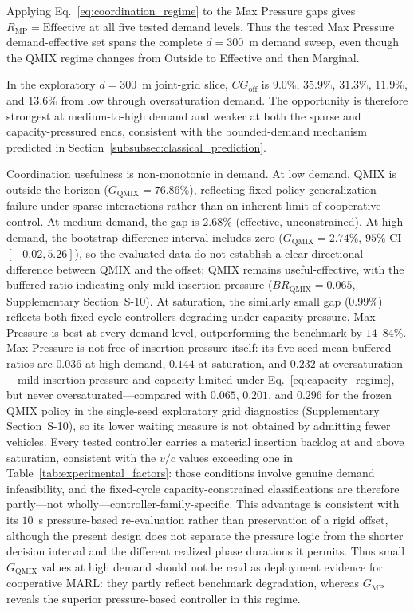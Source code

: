 \documentclass[review,12pt]{elsarticle}
\begin{document}
Applying Eq.~\eqref{eq:coordination_regime} to the Max Pressure gaps gives $R_{\mathrm{MP}}=\mathrm{Effective}$ at all five tested demand levels. Thus the tested Max Pressure demand-effective set spans the complete $d=300$~m demand sweep, even though the QMIX regime changes from Outside to Effective and then Marginal.

In the exploratory $d=300$~m joint-grid slice, $CG_{\mathrm{off}}$ is $9.0\%$, $35.9\%$, $31.3\%$, $11.9\%$, and $13.6\%$ from low through oversaturation demand. The opportunity is therefore strongest at medium-to-high demand and weaker at both the sparse and capacity-pressured ends, consistent with the bounded-demand mechanism predicted in Section~\ref{subsubsec:classical_prediction}.

Coordination usefulness is non-monotonic in demand. At low demand, QMIX is outside the horizon ($G_{\mathrm{QMIX}}=76.86\%$), reflecting fixed-policy generalization failure under sparse interactions rather than an inherent limit of cooperative control. At medium demand, the gap is $2.68\%$ (effective, unconstrained). At high demand, the bootstrap difference interval includes zero ($G_{\mathrm{QMIX}}=2.74\%$, $95\%$ CI $[-0.02, 5.26]$), so the evaluated data do not establish a clear directional difference between QMIX and the offset; QMIX remains useful-effective, with the buffered ratio indicating only mild insertion pressure ($BR_{\mathrm{QMIX}}=0.065$, Supplementary Section~S-10). At saturation, the similarly small gap ($0.99\%$) reflects both fixed-cycle controllers degrading under capacity pressure. Max Pressure is best at every demand level, outperforming the benchmark by $14$--$84\%$. Max Pressure is not free of insertion pressure itself: its five-seed mean buffered ratios are $0.036$ at high demand, $0.144$ at saturation, and $0.232$ at oversaturation---mild insertion pressure and capacity-limited under Eq.~\eqref{eq:capacity_regime}, but never oversaturated---compared with $0.065$, $0.201$, and $0.296$ for the frozen QMIX policy in the single-seed exploratory grid diagnostics (Supplementary Section~S-10), so its lower waiting measure is not obtained by admitting fewer vehicles. Every tested controller carries a material insertion backlog at and above saturation, consistent with the $v/c$ values exceeding one in Table~\ref{tab:experimental_factors}: those conditions involve genuine demand infeasibility, and the fixed-cycle capacity-constrained classifications are therefore partly---not wholly---controller-family-specific. This advantage is consistent with its $10$~s pressure-based re-evaluation rather than preservation of a rigid offset, although the present design does not separate the pressure logic from the shorter decision interval and the different realized phase durations it permits. Thus small $G_{\mathrm{QMIX}}$ values at high demand should not be read as deployment evidence for cooperative MARL: they partly reflect benchmark degradation, whereas $G_{\mathrm{MP}}$ reveals the superior pressure-based controller in this regime.
\end{document}
